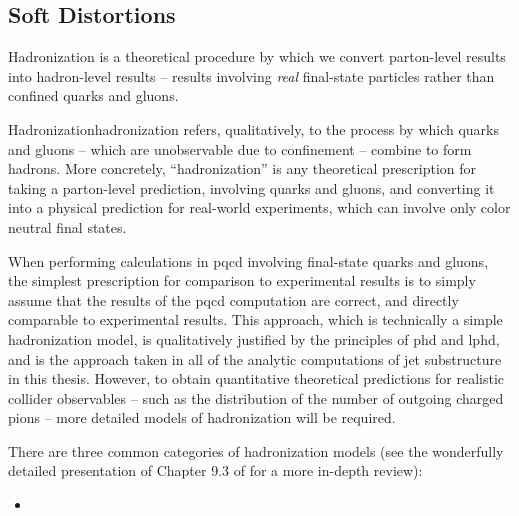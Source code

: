 \begin{subappendices}
\subsection{Soft Distortions}
\label{app:soft-distortions}

Hadronization is a theoretical procedure by which we convert parton-level results into hadron-level results -- results involving \textit{real} final-state particles rather than confined quarks and gluons.

\begin{definitionbox}{Hadronization}{hadronization}
     refers, qualitatively, to the process by which quarks and gluons -- which are unobservable due to confinement -- combine to form hadrons.
    More concretely, ``hadronization'' is any theoretical prescription for taking a parton-level prediction, involving quarks and gluons, and converting it into a physical prediction for real-world experiments, which can involve only color neutral final states.
\end{definitionbox}


When performing calculations in \gls{pqcd} involving final-state quarks and gluons, the simplest prescription for comparison to experimental results is to simply assume that the results of the \gls{pqcd} computation are correct, and directly comparable to experimental results.
%
This approach, which is technically a simple hadronization model, is qualitatively justified by the principles of \gls{phd} and \gls{lphd}, and is the approach taken in all of the analytic computations of jet substructure in this thesis.
%
However, to obtain quantitative theoretical predictions for realistic collider observables -- such as the distribution of the number of outgoing charged pions -- more detailed models of hadronization will be required.


There are three common categories of hadronization models (see the wonderfully detailed presentation of Chapter 9.3 of  for a more in-depth review):
\begin{itemize}
    \item


\end{itemize}
\end{subappendices}
